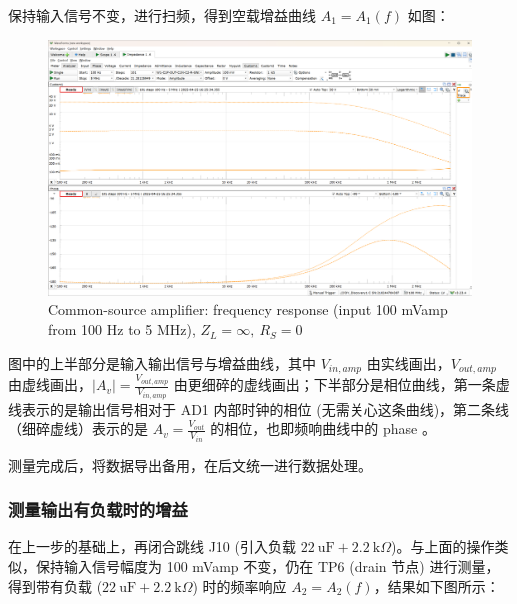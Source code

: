 \documentclass[UTF8]{article}
\begin{document}
\noindent 
保持输入信号不变，进行扫频，得到空载增益曲线 $A_1 = A_1 (f)$ 如图：
\begin{figure}[H]\centering
    \includegraphics[width=\columnwidth]{LCE-04-场效应管/assets/cs amp/cs amp frequency response (input 100 mVamp, 100Hz ~ 5MHz).png}
    \caption{Common-source amplifier: frequency response (input 100 mVamp from 100 Hz to 5 MHz), $Z_L = \infty,\ R_S = 0$}
\end{figure}
图中的上半部分是输入输出信号与增益曲线，其中 $V_{in,amp}$ 由实线画出，$V_{out,amp}$ 由虚线画出，$|A_v| = \frac{V_{out,amp}}{V_{in,amp}}$ 由更细碎的虚线画出；下半部分是相位曲线，第一条虚线表示的是输出信号相对于 AD1 内部时钟的相位 (无需关心这条曲线)，第二条线（细碎虚线）表示的是 $A_v = \frac{V_{out}}{V_{in}}$ 的相位，也即频响曲线中的 phase 。

测量完成后，将数据导出备用，在后文统一进行数据处理。

\subsubsection{测量输出有负载时的增益}

在上一步的基础上，再闭合跳线 J10 (引入负载 $22 \ \mathrm{uF} + 2.2 \ \mathrm{k}\Omega$)。与上面的操作类似，保持输入信号幅度为 100 mVamp 不变，仍在 TP6 (drain 节点) 进行测量，得到带有负载 ($22 \ \mathrm{uF} + 2.2 \ \mathrm{k}\Omega$) 时的频率响应 $A_2 = A_2 (f)$，结果如下图所示：
\end{document}
